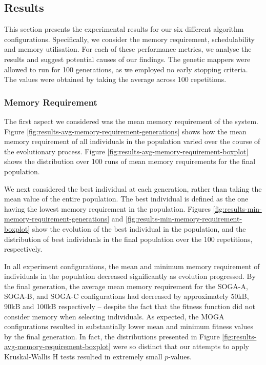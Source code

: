 \documentclass[10pt,conference]{IEEEtran}
\begin{document}
\subsection{Results}\label{sec:results}

This section presents the experimental results for our six different algorithm configurations. Specifically, we consider the memory requirement, schedulability and memory utilisation. For each of these performance metrics, we analyse the results and suggest potential causes of our findings. The genetic mappers were allowed to run for 100 generations, as we employed no early stopping criteria. The values were obtained by taking the average across 100 repetitions.

\subsubsection{Memory Requirement}\label{sec:memory-requirement}

The first aspect we considered was the mean memory requirement of the system. Figure \ref{fig:results-avg-memory-requirement-generations} shows how the mean memory requirement of all individuals in the population varied over the course of the evolutionary process. Figure \ref{fig:results-avg-memory-requirement-boxplot} shows the distribution over 100 runs of mean memory requirements for the final population.

We next considered the best individual at each generation, rather than taking the mean value of the entire population. The best individual is defined as the one having the lowest memory requirement in the population. Figures \ref{fig:results-min-memory-requirement-generations} and \ref{fig:results-min-memory-requirement-boxplot} show the evolution of the best individual in the population, and the distribution of best individuals in the final population over the 100 repetitions, respectively.

In all experiment configurations, the mean and minimum memory requirement of individuals in the population decreased significantly as evolution progressed. By the final generation, the average mean memory requirement for the SOGA-A, SOGA-B, and SOGA-C configurations had decreased by approximately 50kB, 90kB and 100kB respectively -- despite the fact that the fitness function did not consider memory when selecting individuals. As expected, the MOGA configurations resulted in substantially lower mean and minimum fitness values by the final generation. In fact, the distributions presented in Figure \ref{fig:results-avg-memory-requirement-boxplot} were so distinct that our attempts to apply Kruskal-Wallis H tests resulted in extremely small $p$-values.
\end{document}
